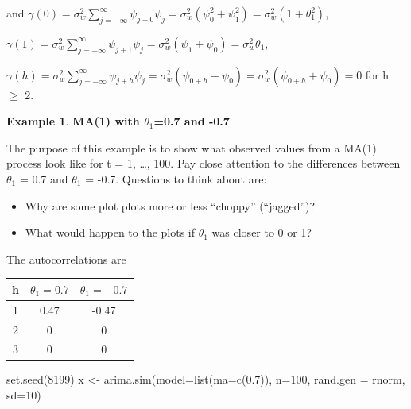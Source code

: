 \documentclass[
]{book}
\newenvironment{Shaded}{\begin{snugshade}}{\end{snugshade}}
\newcommand{\AttributeTok}[1]{\textcolor[rgb]{0.77,0.63,0.00}{#1}}
\newcommand{\DecValTok}[1]{\textcolor[rgb]{0.00,0.00,0.81}{#1}}
\newcommand{\FloatTok}[1]{\textcolor[rgb]{0.00,0.00,0.81}{#1}}
\newcommand{\FunctionTok}[1]{\textcolor[rgb]{0.00,0.00,0.00}{#1}}
\newcommand{\NormalTok}[1]{#1}
\newcommand{\OtherTok}[1]{\textcolor[rgb]{0.56,0.35,0.01}{#1}}
\providecommand{\tightlist}{%
  \setlength{\itemsep}{0pt}\setlength{\parskip}{0pt}}
\theoremstyle{definition}
\theoremstyle{definition}
\newtheorem{example}{Example}[chapter]
\theoremstyle{definition}
\theoremstyle{definition}
\theoremstyle{remark}
\begin{document}
and \(\gamma(0)=\sigma_w^2\sum_{j=-\infty}^{\infty}\psi_{j+0}\psi_j=\sigma_w^2(\psi_0^2+\psi_1^2)=\sigma_w^2(1+\theta_1^2)\),

\(\gamma(1)=\sigma_w^2\sum_{j=-\infty}^{\infty}\psi_{j+1}\psi_j=\sigma_w^2(\psi_1+\psi_0)=\sigma_w^2\theta_1\),

\(\gamma(h)=\sigma_w^2\sum_{j=-\infty}^{\infty}\psi_{j+h}\psi_j=\sigma_w^2(\psi_{0+h}+\psi_0)=\sigma_w^2(\psi_{0+h}+\psi_0)=0\) for h \(\ge\) 2.

\begin{example}
\textbf{MA(1) with \(\theta_1\)=0.7 and -0.7}

The purpose of this example is to show what observed values from a MA(1) process look like for t = 1, \ldots, 100. Pay close attention to the differences between \(\theta_1\) = 0.7 and \(\theta_1\) = -0.7. Questions to think about are:

\begin{itemize}
\tightlist
\item
  Why are some plot plots more or less ``choppy'' (``jagged'')?\\
\item
  What would happen to the plots if \textbar{}\(\theta_1\)\textbar{} was closer to 0 or 1?
\end{itemize}

The autocorrelations are

\begin{longtable}[]{@{}ccc@{}}
\toprule()
h & \(\theta_1=0.7\) & \(\theta_1=-0.7\) \\
\midrule()
\endhead
1 & 0.47 & -0.47 \\
2 & 0 & 0 \\
3 & 0 & 0 \\
\bottomrule()
\end{longtable}

\begin{Shaded}
\begin{Highlighting}[]
\FunctionTok{set.seed}\NormalTok{(}\DecValTok{8199}\NormalTok{)}
\NormalTok{x }\OtherTok{\textless{}{-}} \FunctionTok{arima.sim}\NormalTok{(}\AttributeTok{model=}\FunctionTok{list}\NormalTok{(}\AttributeTok{ma=}\FunctionTok{c}\NormalTok{(}\FloatTok{0.7}\NormalTok{)), }\AttributeTok{n=}\DecValTok{100}\NormalTok{, }\AttributeTok{rand.gen =}\NormalTok{ rnorm, }\AttributeTok{sd=}\DecValTok{10}\NormalTok{)}


\end{Highlighting}
\end{Shaded}
\end{example}
\end{document}
